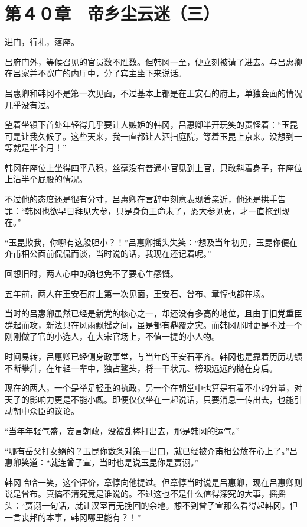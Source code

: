 \section{第４０章　帝乡尘云迷（三）}

进门，行礼，落座。

吕府门外，等候召见的官员数不胜数。但韩冈一至，便立刻被请了进去。与吕惠卿在吕家并不宽广的内厅中，分了宾主坐下来说话。

吕惠卿和韩冈不是第一次见面，不过基本上都是在王安石的府上，单独会面的情况几乎没有过。

望着坐镇下首处年轻得几乎要让人嫉妒的韩冈，吕惠卿半开玩笑的责怪着：“玉昆可是让我久候了。这些天来，我一直都让人洒扫庭院，等着玉昆上京来。没想到一等就是半个月！”

韩冈在座位上坐得四平八稳，丝毫没有普通小官见到上官，只敢斜着身子，在座位上沾半个屁股的情况。

不过他的态度还是很有分寸，吕惠卿在言辞中刻意表现着亲近，他还是拱手告罪：“韩冈也欲早日拜见大参，只是身负王命未了，恐大参见责，才一直拖到现在。”

“玉昆欺我，你哪有这般胆小？！”吕惠卿摇头失笑：“想及当年初见，玉昆你便在介甫相公面前侃侃而谈，当时说的话，我现在还记着呢。”

回想旧时，两人心中的确也免不了要心生感慨。

五年前，两人在王安石府上第一次见面，王安石、曾布、章惇也都在场。

当时的吕惠卿虽然已经是新党的核心之一，却还没有多高的地位，且由于旧党重臣群起而攻，新法只在风雨飘摇之间，虽是都有鼎覆之灾。而韩冈那时更是不过一个刚刚做了官的小选人，在大宋官场上，不值一提的小人物。

时间易转，吕惠卿已经侧身政事堂，与当年的王安石平齐。韩冈也是靠着历历功绩不断攀升，在年轻一辈中，独占鳌头，将一干状元、榜眼远远的抛在身后。

现在的两人，一个是举足轻重的执政，另一个在朝堂中也算是有着不小的分量，对天子的影响力更是不能小觑。即便仅仅坐在一起说话，只要消息一传出去，也能引动朝中众臣的议论。

“当年年轻气盛，妄言朝政，没被乱棒打出去，那是韩冈的运气。”

“哪有岳父打女婿的？玉昆你数条对策一出口，就已经被介甫相公放在心上了。”吕惠卿笑道：“就连曾子宣，当时也是说玉昆你是贾诩。”

韩冈哈哈一笑，这个评价，章惇向他提过。但章惇当时说是吕惠卿，现在吕惠卿则说是曾布。真搞不清究竟是谁说的。不过这也不是什么值得深究的大事，摇摇头：“贾诩一句话，就让汉室再无挽回的余地。想不到曾子宣那么看得起韩冈。但一言丧邦的本事，韩冈哪里能有？！”

